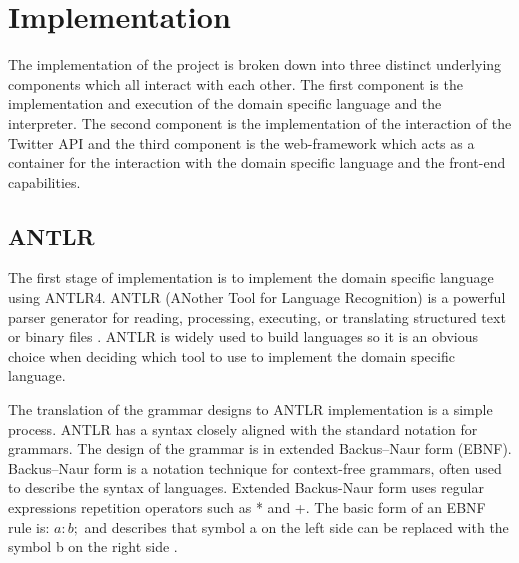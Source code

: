 \chapter{Implementation}

The implementation of the project is broken down into three distinct underlying components which all interact with each other. The first component is the implementation and execution of the domain specific language and the interpreter. The second component is the implementation of the interaction of the Twitter API and the third component is the web-framework which acts as a container for the interaction with the domain specific language and the front-end capabilities.

\section{ANTLR}

The first stage of implementation is to implement the domain specific language using ANTLR4. ANTLR (ANother Tool for Language Recognition) is a powerful parser generator for reading, processing, executing, or translating structured text or binary files \cite{antlr}. ANTLR is widely used to build languages so it is an obvious choice when deciding which tool to use to implement the domain specific language. \newline \par

The translation of the grammar designs to ANTLR implementation is a simple process. ANTLR has a syntax closely aligned with the standard notation for grammars. The design of the grammar is in extended Backus–Naur form (EBNF). Backus–Naur form is a notation technique for context-free grammars, often used to describe the syntax of languages. Extended Backus-Naur form uses regular expressions repetition operators such as * and +. The basic form of an EBNF rule is: $a : b;$ and describes that symbol a on the left side can be replaced with the symbol b on the right side \cite{standard1996ebnf}.\newline \par

